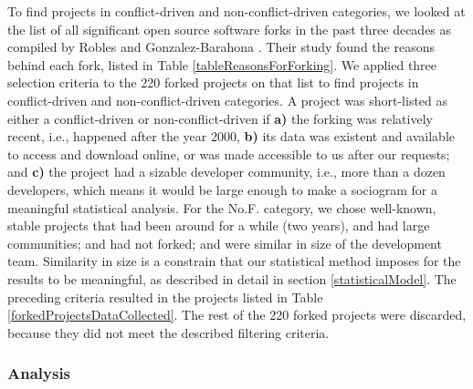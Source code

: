 \documentclass[12pt]{report}
\begin{document}

To find projects in conflict-driven and non-conflict-driven categories, we looked at the list of all significant open source software forks in the past three decades as compiled by Robles and Gonzalez-Barahona \cite{Robles}. Their study found the reasons behind each fork, listed in Table \ref{tableReasonsForForking}. We applied three selection criteria to the 220 forked projects on that list to find projects in conflict-driven and non-conflict-driven categories. A project was short-listed as either a conflict-driven or non-conflict-driven if \textbf{a)} the forking was relatively recent, i.e., happened after the year 2000, \textbf{b)} its data was existent and available to access and download online, or was made accessible to us after our requests; and \textbf{c)} the project had a sizable developer community, i.e., more than a dozen developers, which means it would be large enough to make a sociogram for a meaningful statistical analysis. For the No.F. category, we chose well-known, stable projects that had been around for a while (two years), and had large communities; and had not forked; and were similar in size of the development team. Similarity in size is a constrain that our statistical method imposes for the results to be meaningful, as described in detail in section \ref{statisticalModel}.  The preceding criteria resulted in the projects listed in Table \ref{forkedProjectsDataCollected}. The rest of the 220 forked projects were discarded, because they did not meet the described filtering criteria.


\subsubsection{Analysis}
\end{document}
